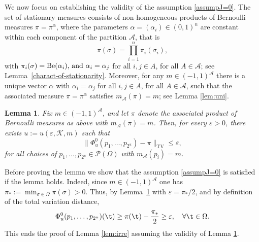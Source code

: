 \documentclass[11pt,reqno]{amsart}
\numberwithin{equation}{section}
\numberwithin{figure}{section}
\newtheorem{lemma}[theorem]{Lemma}
\renewcommand{\leq}{\le}%
\renewcommand{\geq}{\ge} %
\newcommand{\1}{\mathds{1}}
\let\a=\alpha \let\b=\beta \let\g=\gamma \let\d=\delta
\let\e=\varepsilon \let\f=\varphi \let\l=\lambda
\let\si=\sigma
\let\O=\Omega
\newcommand{\cA}{\ensuremath{\mathcal A}}
\newcommand{\cP}{\ensuremath{\mathcal P}}
\begin{document}
We now focus on establishing the validity of the assumption \eqref{assumpJ=0}. 
The set of stationary measures consists of non-homogeneous products of Bernoulli measures $\pi=\pi^\a$, where the parameters $\a=(\a_i)\in(0,1)^n$ are constant within each component of the partition \(\mathcal{A}\),
that is \[
\pi(\sigma) = \textstyle{\prod_{i=1}^n} \pi_i(\sigma_i),
\]
with \(\pi_i(\si) = {\rm Be}(\a_i)$, and \(\a_i = \a_j\) for all \(i, j \in A\), for all \(A \in \mathcal{A}\); see Lemma~\ref{charact-of-stationarity}.
Moreover, for any $m\in(-1,1)^\cA$ there is a unique vector $\a$ with \(\a_i = \a_j\) for all \(i, j \in A\), for all \(A \in \mathcal{A}\), such that the associated measure $\pi=\pi^\a$ satisfies $m_\cA(\pi)=m$; see Lemma \ref{lem:uni}.
\begin{lemma}\label{J=0 irredu}
Fix $m\in(-1,1)^\cA$, and let \(\pi\) denote the associated product of Bernoulli measures as above with \(m_\cA(\pi)=m\). Then, for every \(\varepsilon > 0\), there exists  \(u := u(\varepsilon, \mathcal{K}, m)\) such that
\begin{equation}\label{eq:toprotv}
    \|\Phi_u^0(p_1,\dots,p_{2^u}) - \pi\|_{\mathrm{TV}} \leq \varepsilon,
\end{equation}
for all choices of \(p_1, \ldots, p_{2^u}\in\cP(\O)\) with  \(m_\cA(p_i) = m\).
\end{lemma}
Before proving the lemma we show that  the assumption \eqref{assumpJ=0} is satisfied if the lemma holds. Indeed, 
since $m\in(-1,1)^\cA$ one has $\pi_* := \min_{\sigma \in \Omega} \pi(\sigma) > 0$. Thus, by 
Lemma~\ref{J=0 irredu} with \(\varepsilon= \pi_*/2\), and by definition of the total variation distance, 
\begin{equation}\label{assumpJ=00}
    \Phi^0_u(p_1,\dots,p_{2^u})(\t) \geq \pi(\t) - \frac{\pi_*}{2} \geq \e, \quad \forall \t\in\O.
\end{equation}
This ends the proof of Lemma \ref{lem:irre} assuming the validity of Lemma \ref{J=0 irredu}.
\end{document}
